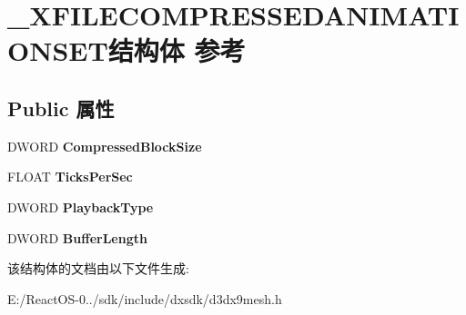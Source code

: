 \hypertarget{struct___x_f_i_l_e_c_o_m_p_r_e_s_s_e_d_a_n_i_m_a_t_i_o_n_s_e_t}{}\section{\+\_\+\+X\+F\+I\+L\+E\+C\+O\+M\+P\+R\+E\+S\+S\+E\+D\+A\+N\+I\+M\+A\+T\+I\+O\+N\+S\+E\+T结构体 参考}
\label{struct___x_f_i_l_e_c_o_m_p_r_e_s_s_e_d_a_n_i_m_a_t_i_o_n_s_e_t}
\subsection*{Public 属性}
\begin{DoxyCompactItemize}
\item 
\mbox{\label{struct___x_f_i_l_e_c_o_m_p_r_e_s_s_e_d_a_n_i_m_a_t_i_o_n_s_e_t_ae5b07f7e81598e849d5a086e9d111bbb}} 
D\+W\+O\+RD {\bfseries Compressed\+Block\+Size}
\item 
\mbox{\label{struct___x_f_i_l_e_c_o_m_p_r_e_s_s_e_d_a_n_i_m_a_t_i_o_n_s_e_t_aba3e8bdcab6910d564471658aa73a211}} 
F\+L\+O\+AT {\bfseries Ticks\+Per\+Sec}
\item 
\mbox{\label{struct___x_f_i_l_e_c_o_m_p_r_e_s_s_e_d_a_n_i_m_a_t_i_o_n_s_e_t_ab5462427524d26377cd8b679071e4702}} 
D\+W\+O\+RD {\bfseries Playback\+Type}
\item 
\mbox{\label{struct___x_f_i_l_e_c_o_m_p_r_e_s_s_e_d_a_n_i_m_a_t_i_o_n_s_e_t_aa009402d9306c499de2da897bbe4c81c}} 
D\+W\+O\+RD {\bfseries Buffer\+Length}
\end{DoxyCompactItemize}


该结构体的文档由以下文件生成\+:\begin{DoxyCompactItemize}
\item 
E\+:/\+React\+O\+S-\/0../sdk/include/dxsdk/d3dx9mesh.\+h\end{DoxyCompactItemize}
